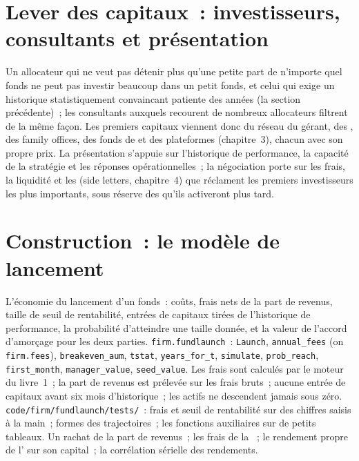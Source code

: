 \section{Lever des capitaux~: investisseurs, consultants et présentation}

Un allocateur qui ne veut pas détenir plus qu'une petite part de n'importe quel fonds ne peut pas investir beaucoup dans un petit fonds, et celui qui exige un historique statistiquement
convaincant patiente des années (la section précédente)~; les consultants auxquels recourent de nombreux allocateurs filtrent de la même façon. Les premiers capitaux viennent donc
du réseau du gérant, des , des family offices, des fonds de  et des plateformes (chapitre~3), chacun avec son propre prix. La présentation s'appuie sur l'historique de performance, la capacité de la stratégie et les
réponses opérationnelles~; la négociation porte sur les frais, la liquidité et les  (side letters, chapitre~4) que réclament les premiers investisseurs les plus importants, sous réserve des
 qu'ils activeront plus tard.

\section{Construction~: le modèle de lancement}\label{bld:fm:launching-a-fund-and-raising-capital:fundlaunch}

\begin{build}
 L'économie du lancement d'un fonds~: coûts, frais nets de la part de revenus, taille de seuil de rentabilité, entrées de capitaux tirées de l'historique de performance, la
probabilité d'atteindre une taille donnée, et la valeur de l'accord d'amorçage pour les deux parties.
 \texttt{firm.fundlaunch}~: \texttt{Launch}, \texttt{annual\_fees} (on \texttt{firm.fees}), \texttt{breakeven\_aum}, \texttt{tstat},
\texttt{years\_for\_t}, \texttt{simulate}, \texttt{prob\_reach}, \texttt{first\_month}, \texttt{manager\_value}, \texttt{seed\_value}.
 Les frais sont calculés par le moteur du livre~1~; la part de revenus est prélevée sur les frais bruts~; aucune entrée de capitaux avant six mois d'historique~; les actifs
ne descendent jamais sous zéro.
 \texttt{code/firm/fundlaunch/tests/}~: frais et seuil de rentabilité sur des chiffres saisis à la main~; formes des trajectoires~; les fonctions auxiliaires sur de petits tableaux.
 Un rachat de la part de revenus~; les frais de la ~; le rendement propre de l' sur son capital~; la corrélation sérielle des rendements.
\end{build}

